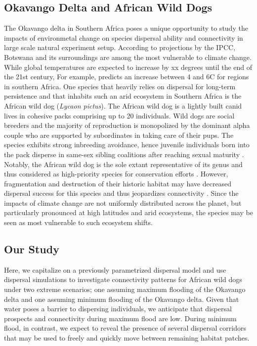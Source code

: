 \documentclass[abstract=on,10pt,a4paper,bibliography=totocnumbered]{article}
\begin{document}
\subsection{Okavango Delta and African Wild Dogs}
The Okavango delta in Southern Africa poses a unique opportunity to study the
impacts of environmetal change on species dispersal ability and connectivity in
large scale natural experiment setup. According to projections by the IPCC,
Botswana and its surroundings are among the most vulnerable to climate change.
While global temperatures are expected to increase by xx degrees until the end
of the 21st century, For example, \cite{Engelbrecht.2015} predicts an increase
between 4 and 6\degree C for regions in southern Africa. One species that
heavily relies on dispersal for long-term persistence and that inhabits such an
arid ecosystem in Southern Africa is the African wild dog (\textit{Lycaon
pictus}). The African wild dog is a lightly built canid lives in cohesive packs
comprising up to 20 individuals. Wild dogs are social breeders and the majority
of reproduction is monopolized by the dominant alpha couple who are supported by
subordinates in taking care of their pups. The species exhibits strong
inbreeding avoidance, hence juvenile individuals born into the pack disperse in
same-sex sibling coalitions after reaching sexual maturity \citep{McNutt.1996,
Behr.2020}. Notably, the African wild dog is the sole extant representative of
its genus and thus considered as high-priority species for conservation efforts
\citep{Leigh.2012}. However, fragmentation and destruction of their historic
habitat may have decreased dispersal success for this species and thus
jeopardizes connectivity \citep{Leigh.2012}. Since the impacts of climate change
are not uniformly distributed across the planet, but particularly pronounced at
high latitudes and arid ecosystems, the species may be seen as most vulnerable
to such ecosystem shifts.

\subsection{Our Study}
Here, we capitalize on a previously parametrized dispersal model and use
dispersal simulations to investigate connectivity patterns for African wild dogs
under two extreme scenarios; one assuming maximum flooding of the Okavango delta
and one assuming minimum flooding of the Okavango delta. Given that water poses
a barrier to dispersing individuals, we anticipate that dispersal prospects and
connectivity during maximum flood are low. During minimum flood, in contrast, we
expect to reveal the presence of several dispersal corridors that may be used to
freely and quickly move between remaining habitat patches.
\end{document}
